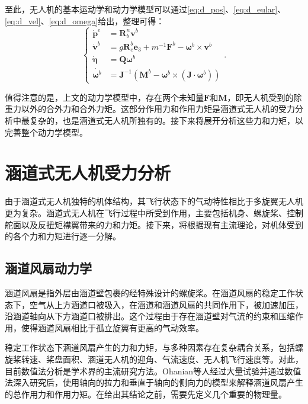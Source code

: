 至此，无人机的基本运动学和动力学模型可以通过\eqref{eq:d_pos}、\eqref{eq:d_eular}、\eqref{eq:d_vel}、\eqref{eq:d_omega}给出，整理可得：
\begin{equation}
    \begin{cases} 
        \dot{\boldsymbol{p}}^e &= \boldsymbol{R}_b^n \boldsymbol{v}^b \\ 
        \dot{\boldsymbol{v}}^b &= g\boldsymbol{R}_e^b\boldsymbol{e}_3 + m^{-1} \boldsymbol{F}^b - \boldsymbol{\omega}^b \times \boldsymbol{v}^b  \\ 
        \dot{\boldsymbol{\eta}} &= \boldsymbol{Q}\boldsymbol{\omega}^b \\ 
        \dot{\boldsymbol{\omega}^b} &= \boldsymbol{J}^{-1}(\boldsymbol{M}^b - \boldsymbol{\omega}^b\times(\boldsymbol{J}\cdot\boldsymbol{\omega}^b)) 
    \end{cases} .
    \label{eq:base_dynamic}
\end{equation}

值得注意的是，上文的动力学模型中，存在两个未知量$\boldsymbol{F}$和$\boldsymbol{M}$，即无人机受到的除重力以外的合外力和合外力矩。这部分作用力和作用力矩是涵道式无人机的受力分析中最复杂的，也是涵道式无人机所独有的。接下来将展开分析这些力和力矩，以完善整个动力学模型。

\section{涵道式无人机受力分析}
由于涵道式无人机独特的机体结构，其飞行状态下的气动特性相比于多旋翼无人机更为复杂。涵道式无人机在飞行过程中所受到作用，主要包括机身、螺旋桨、控制舵面以及反扭矩襟翼带来的力和力矩。接下来，将根据现有主流理论，对机体受到的各个力和力矩进行逐一分解。

\subsection{涵道风扇动力学}
涵道风扇是指外层由涵道壁包裹的经特殊设计的螺旋桨。在涵道风扇的稳定工作状态下，空气从上方涵道口被吸入，在涵道和涵道风扇的共同作用下，被加速加压，沿涵道轴向从下方涵道口被排出。这个过程由于存在涵道壁对气流的约束和压缩作用，使得涵道风扇相比于孤立旋翼有更高的气动效率。

稳定工作状态下涵道风扇产生的力和力矩，与多种因素存在复杂耦合关系，包括螺旋桨转速、桨盘面积、涵道无人机的迎角、气流速度、无人机飞行速度等。对此，目前数值法分析是学术界的主流研究方法\cite{cheng2021, han2022}。Ohanian等人经过大量试验并通过数值法深入研究后，使用轴向的拉力和垂直于轴向的侧向力的模型来解释涵道风扇产生的总作用力和作用力矩\cite{2012Nondimensional}。在给出其结论之前，需要先定义几个重要的物理量。


